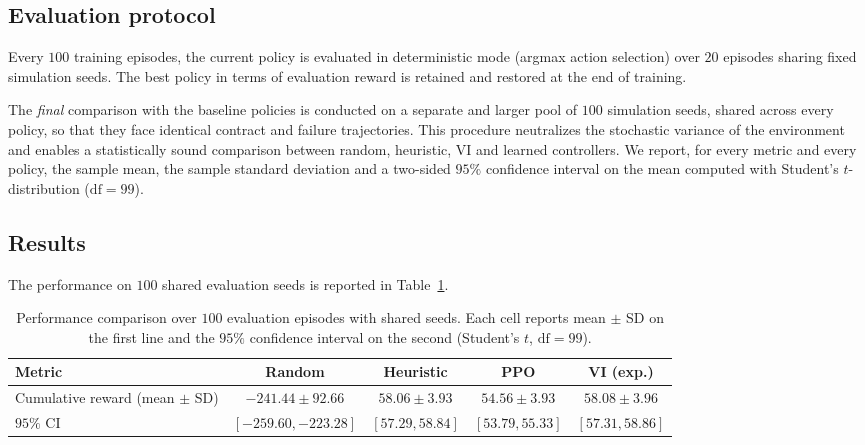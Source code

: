\subsection{Evaluation protocol}
\label{subsec:eval-protocol}

Every $100$ training episodes, the current policy is evaluated in deterministic mode (argmax action selection) over $20$ episodes sharing fixed simulation seeds. The best policy in terms of evaluation reward is retained and restored at the end of training.

The \emph{final} comparison with the baseline policies is conducted on a separate and larger pool of $100$ simulation seeds, shared across every policy, so that they face identical contract and failure trajectories. This procedure neutralizes the stochastic variance of the environment and enables a statistically sound comparison between random, heuristic, VI and learned controllers. We report, for every metric and every policy, the sample mean, the sample standard deviation and a two-sided $95\%$ confidence interval on the mean computed with Student's $t$-distribution ($\mathrm{df}=99$).


\subsection{Results}
\label{subsec:results}

The performance on $100$ shared evaluation seeds is reported in Table~\ref{tab:results}.

\begin{table}[h]
\centering
\footnotesize
\setlength{\tabcolsep}{6pt}
\begin{tabular}{lcccc}
\toprule
Metric & Random & Heuristic & PPO & VI (exp.) \\
\midrule
Cumulative reward (mean $\pm$ SD) &
    $-241.44 \pm 92.66$ &
    $58.06 \pm 3.93$ &
    $54.56 \pm 3.93$ &
    $58.08 \pm 3.96$ \\
$95\%$ CI &
    $[-259.60, -223.28]$ &
    $[57.29, 58.84]$ &
    $[53.79, 55.33]$ &
    $[57.31, 58.86]$ \\
\bottomrule
\end{tabular}
\caption{Performance comparison over $100$ evaluation episodes with shared seeds. Each cell reports mean $\pm$ SD on the first line and the $95\%$ confidence interval on the second (Student's $t$, $\mathrm{df}=99$).}
\label{tab:results}
\end{table}

